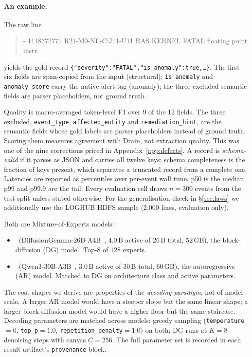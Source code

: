 \paragraph{An example.}
The raw line
\begin{quote}\small\ttfamily
- 1118772771 R21-M0-NF-C:J11-U11 RAS KERNEL FATAL floating point instr.
\end{quote}
yields the gold record \texttt{\{"severity":"FATAL","is\_anomaly":true,\ldots\}}.
The first six fields are span-copied from the input (structural);
\texttt{is\_anomaly} and \texttt{anomaly\_score} carry the native alert
tag (anomaly); the three excluded semantic fields are parser
placeholders, not ground truth.

Quality is macro-averaged token-level F1 over 9 of the 12 fields. The
three excluded, \texttt{event\_type}, \texttt{affected\_entity} and
\texttt{remediation\_hint}, are the semantic fields whose gold
labels are parser placeholders instead of ground truth. Scoring them
measures agreement with Drain, not extraction quality. This was one of
the nine corrections priced in Appendix~\ref{app:defects}.
A record is \emph{schema-valid} if it parses as JSON and carries all
twelve keys; schema completeness is the fraction of keys present, which
separates a truncated record from a complete one. Latencies are
reported as percentiles over per-event wall time. p50 is the median;
p99 and p99.9 are the tail. Every evaluation cell draws $n = 300$ events
from the test split unless stated otherwise. For the generalisation check in \S\ref{sec:laws} we
additionally use the LOGHUB HDFS sample (2{,}000 lines, evaluation
only).

Both are Mixture-of-Experts models:
\begin{itemize}[nosep]
\item \DG\ (DiffusionGemma-26B-A4B~\cite{diffusiongemma}, 4.0\,B active
  of 26\,B total, 52\,GB), the block-diffusion (DG) model. Top-8 of 128
  experts.
\item \ARthree\ (Qwen3-30B-A3B~\cite{qwen25}, 3.0\,B active of 30\,B
  total, 60\,GB), the autoregressive (AR) model. Matched to DG on
  architecture class and active parameters.
\end{itemize}
The cost shapes we derive are properties of the \emph{decoding
paradigm}, not of model scale. A larger AR model would have a steeper
slope but the same linear shape; a larger block-diffusion model would have a
higher floor but the same staircase. Decoding parameters are matched
across models: greedy sampling (\texttt{temperature}${=}0$,
\texttt{top\_p}${=}1.0$, \texttt{repetition\_penalty}${=}1.0$) on
both; DG runs at $K{=}8$ denoising steps with canvas $C{=}256$. The
full parameter set is recorded in each result artifact's
\texttt{provenance} block.

